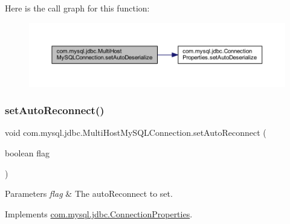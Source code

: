 Here is the call graph for this function\+:
\nopagebreak
\begin{figure}[H]
\begin{center}
\leavevmode
\includegraphics[width=350pt]{classcom_1_1mysql_1_1jdbc_1_1_multi_host_my_s_q_l_connection_a893d57a444b9a9bb7791efc34450b259_cgraph}
\end{center}
\end{figure}
\mbox{\label{classcom_1_1mysql_1_1jdbc_1_1_multi_host_my_s_q_l_connection_a5444b292e218f16cfc2baadf784c35ab}} 
\subsubsection{\texorpdfstring{set\+Auto\+Reconnect()}{setAutoReconnect()}}
{\footnotesize\ttfamily void com.\+mysql.\+jdbc.\+Multi\+Host\+My\+S\+Q\+L\+Connection.\+set\+Auto\+Reconnect (\begin{DoxyParamCaption}\item[{boolean}]{flag }\end{DoxyParamCaption})}


\begin{DoxyParams}{Parameters}
{\em flag} & The auto\+Reconnect to set. \\
\hline
\end{DoxyParams}


Implements \mbox{\hyperlink{interfacecom_1_1mysql_1_1jdbc_1_1_connection_properties_aee554c71f65458593f28c1e7d79846d1}{com.\+mysql.\+jdbc.\+Connection\+Properties}}.

